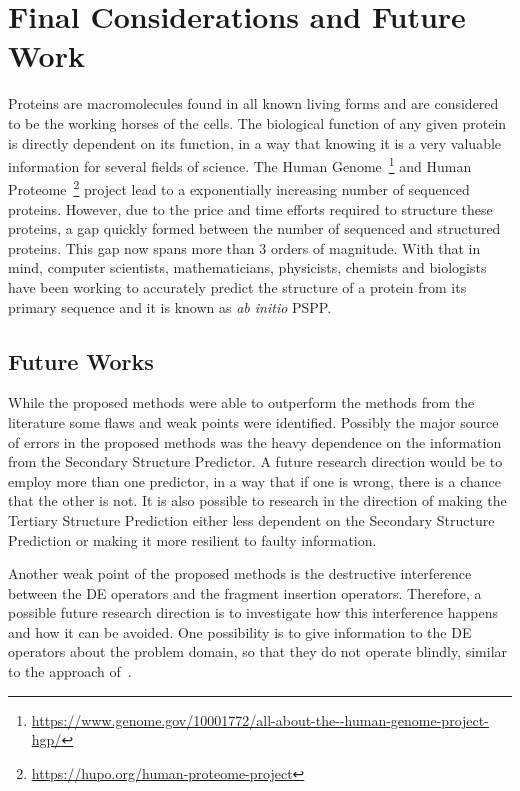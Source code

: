 \chapter{Final Considerations and Future Work}
\label{chap:final_considerations}

Proteins are macromolecules found in all known living forms and are
considered to be the working horses of the cells. The biological
function of any given protein is directly dependent on its
function, in a way that knowing it is a very valuable information
for several fields of science. The Human
Genome~\footnote{\url{https://www.genome.gov/10001772/all-about-the--human-genome-project-hgp/}}
and Human Proteome~\footnote{\url{https://hupo.org/human-proteome-project}} project
lead to a exponentially increasing number of sequenced proteins.
However, due to the price and time efforts required to structure
these proteins, a gap quickly formed between the number of sequenced
and structured proteins. This gap now spans more than 3 orders
of magnitude. With that in mind, computer scientists, mathematicians,
physicists, chemists and biologists have been working to accurately
predict the structure of a protein from its primary
sequence and it is known as \textit{ab initio} PSPP.

\section{Future Works}\label{sec:future_works}

While the proposed methods were able to outperform the methods from the
literature some flaws and weak points were identified. Possibly the major
source of errors in the proposed methods was the heavy dependence on the
information from the Secondary Structure Predictor. A future research direction
would be to employ more than one predictor, in a way that if one is wrong,
there is a chance that the other is not. It is also possible to research in the
direction of making the Tertiary Structure Prediction either less dependent on
the Secondary Structure Prediction or making it more resilient to faulty
information.

Another weak point of the proposed methods is the destructive interference
between the DE operators and the fragment insertion operators. Therefore, a
possible future research direction is to investigate how this interference
happens and how it can be avoided.  One possibility is to give information to
the DE operators about the problem domain, so that they do not operate blindly,
similar to the approach of~\cite{borguesan2015apl}.


